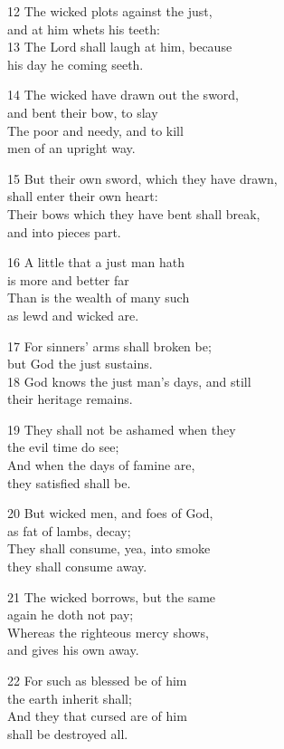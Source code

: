 \begin{multicols}{3}
12 The wicked plots against the just,\\
and at him whets his teeth:\\
13 The Lord shall laugh at him, because\\
his day he coming seeth.

14 The wicked have drawn out the sword,\\
and bent their bow, to slay\\
The poor and needy, and to kill\\
men of an upright way.

15 But their own sword, which they have drawn,\\
shall enter their own heart:\\
Their bows which they have bent shall break,\\
and into pieces part.

16 A little that a just man hath\\
is more and better far\\
Than is the wealth of many such\\
as lewd and wicked are.

17 For sinners’ arms shall broken be;\\
but God the just sustains.\\
18 God knows the just man’s days, and still\\
their heritage remains.

19 They shall not be ashamed when they\\
the evil time do see;\\
And when the days of famine are,\\
they satisfied shall be.

20 But wicked men, and foes of God,\\
as fat of lambs, decay;\\
They shall consume, yea, into smoke\\
they shall consume away.

21 The wicked borrows, but the same\\
again he doth not pay;\\
Whereas the righteous mercy shows,\\
and gives his own away.

22 For such as blessed be of him\\
the earth inherit shall;\\
And they that cursed are of him\\
shall be destroyed all.


\end{multicols}
